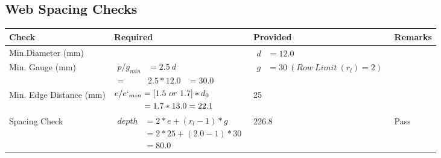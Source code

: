 \documentclass{article}%
\begin{document}
\subsection{Web Spacing Checks}%
\label{subsec:WebSpacingChecks}%
\renewcommand{\arraystretch}{1.2}%
\begin{longtable}{|p{2.5cm}|p{7.5cm}|p{5cm}|p{1cm}|}%
\hline%
\rowcolor{OsdagGreen}%
Check&Required&Provided&Remarks\\%
\hline%
\endhead%
\hline%
Min.Diameter (mm)&&$\begin{aligned} d &=12.0\end{aligned}$&\\%
\hline%
Min. Gauge (mm)&$\begin{aligned}p/g_{min}&= 2.5 ~ d&\\ =&2.5*12.0&=30.0\end{aligned}$&$\begin{aligned} g &=30~(Row~Limit~(r_l) = 2)\end{aligned}$&\\%
\hline%
Min. Edge Distance (mm)&$\begin{aligned}e/e`_{min} &=[1.5~or~ 1.7] * d_0\\ &=1.7*13.0=22.1 \end{aligned}$&25&\\%
\hline%
Spacing Check&$\begin{aligned} depth & = 2 * e + (r_l -1) * g\\ & = 2 * 25+(2.0-1)*30\\ & = 80.0\end{aligned}$&226.8&Pass\\%
\hline%
\end{longtable}

%
\newpage%
\end{document}
